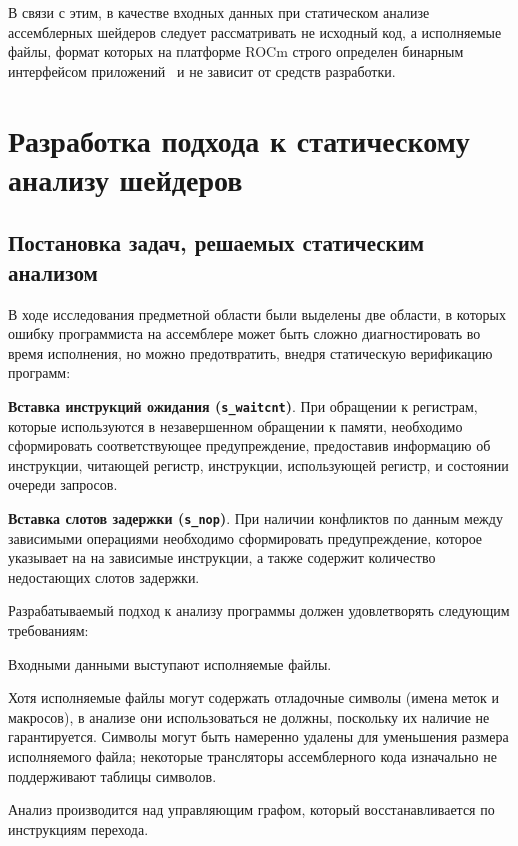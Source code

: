 \documentclass[a4paper,14pt]{extarticle}
\begin{document}
{В связи с этим, в качестве входных данных при статическом анализе ассемблерных шейдеров
следует рассматривать не исходный код, а исполняемые файлы, формат которых
на платформе ROCm строго определен бинарным интерфейсом приложений~\cite{amdgpu-abi} и не
зависит от средств разработки. 

\newpage
\section{Разработка подхода к статическому анализу шейдеров}
\label{section:algorithms}

\subsection{Постановка задач, решаемых статическим анализом}

В ходе исследования предметной области были выделены две области, в которых ошибку программиста
на ассемблере может быть сложно диагностировать во время исполнения, но можно
предотвратить, внедря статическую верификацию программ:
\begin{ol}
\item \textbf{Вставка инструкций ожидания (\texttt{s\_waitcnt})}. При обращении к регистрам,
которые используются в незавершенном обращении к памяти, необходимо сформировать соответствующее
предупреждение, предоставив информацию об инструкции, читающей регистр, инструкции,
использующей регистр, и состоянии очереди запросов.
\item \textbf{Вставка слотов задержки (\texttt{s\_nop})}. При наличии конфликтов по данным
между зависимыми операциями необходимо сформировать предупреждение, которое указывает на
на зависимые инструкции, а также содержит количество недостающих слотов задержки.
\end{ol}

Разрабатываемый подход к анализу программы должен удовлетворять следующим требованиям:

\begin{ul}
\item Входными данными выступают исполняемые файлы.
\item Хотя исполняемые файлы могут содержать отладочные символы (имена меток и макросов),
в анализе они использоваться не должны, поскольку их наличие не гарантируется. Символы могут быть
намеренно удалены для уменьшения размера исполняемого файла; некоторые трансляторы ассемблерного
кода изначально не поддерживают таблицы символов.
\item Анализ производится над управляющим графом, который восстанавливается по инструкциям перехода.
\end{ul}

}
\end{document}
